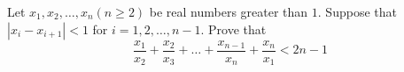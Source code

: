 Let $x_1, x_2, \ldots ,x_n(n\ge 2)$ be real numbers greater than $1$. Suppose that $|x_i-x_{i+1}|<1$ for $i=1, 2,\ldots ,n-1$. Prove that\[\frac{x_1}{x_2}+\frac{x_2}{x_3}+\ldots +\frac{x_{n-1}}{x_n}+\frac{x_n}{x_1}<2n-1\]